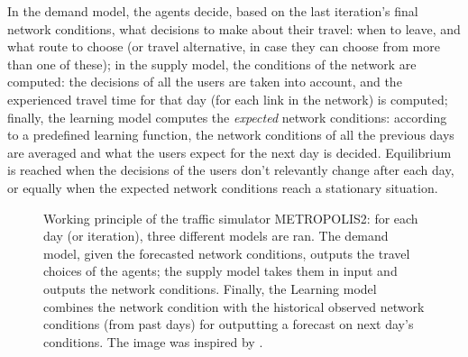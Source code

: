 In the demand model, the agents decide,
based on the last iteration's final network conditions,
what decisions to make about their travel:
when to leave, and what route to choose (or travel alternative, in case they can choose from more than one of these);
in the supply model, the conditions of the network are computed:
the decisions of all the users are taken into account, and the experienced travel time for that day
(for each link in the network) is computed;
finally, the learning model computes the \textit{expected} network conditions:
according to a predefined learning function,
the network conditions of all the previous days are averaged and what the users expect for the next day is decided.
Equilibrium is reached when the decisions of the users don't relevantly change after each day,
or equally when the expected network conditions reach a stationary situation.
\begin{figure}
  \centering
  \caption{Working principle of the traffic simulator METROPOLIS2:
    for each day (or iteration), three different models are ran.
    The demand model, given the forecasted network conditions, outputs the travel choices of the agents;
    the supply model takes them in input and outputs the network conditions.
    Finally, the Learning model combines the network condition with the historical observed network conditions (from past days) for outputting a forecast on next day's conditions.
  The image was inspired by \textcite{RePEc:ema:worpap:2024-03}.}
  \label{fig:metr_func}
\end{figure}






